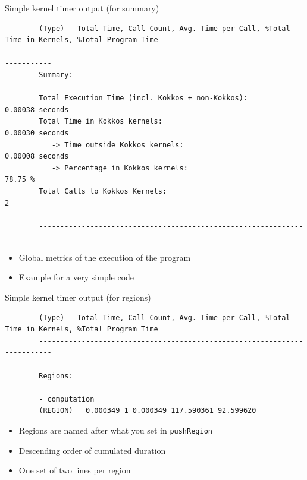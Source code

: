 \documentclass[
    aspectratio=169,
    \createHandout
]{beamer}
\begin{document}
\begin{frame}[fragile]{Simple kernel timer output (for summary)}
    \begin{verbatim}
        (Type)   Total Time, Call Count, Avg. Time per Call, %Total Time in Kernels, %Total Program Time
        -------------------------------------------------------------------------
        Summary:

        Total Execution Time (incl. Kokkos + non-Kokkos):                   0.00038 seconds
        Total Time in Kokkos kernels:                                       0.00030 seconds
           -> Time outside Kokkos kernels:                                  0.00008 seconds
           -> Percentage in Kokkos kernels:                                   78.75 %
        Total Calls to Kokkos Kernels:                                            2

        -------------------------------------------------------------------------
    \end{verbatim}
    \begin{itemize}
        \item Global metrics of the execution of the program
        \item Example for a very simple code
    \end{itemize}
\end{frame}

\begin{frame}[fragile]{Simple kernel timer output (for regions)}
    \begin{verbatim}
        (Type)   Total Time, Call Count, Avg. Time per Call, %Total Time in Kernels, %Total Program Time
        -------------------------------------------------------------------------

        Regions:

        - computation
        (REGION)   0.000349 1 0.000349 117.590361 92.599620
    \end{verbatim}

    \begin{itemize}
        \item Regions are named after what you set in \texttt{pushRegion}
        \item Descending order of cumulated duration
        \item One set of two lines per region
    \end{itemize}
\end{frame}
\end{document}
